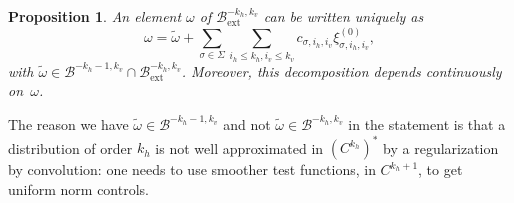 \documentclass[10pt]{amsart}
\newcommand{\ext}{\mathrm{ext}}
\newcommand{\boB}{\mathcal{B}}
\newtheorem{prop}[thm]{Proposition}
\theoremstyle{definition}
\numberwithin{equation}{section}
\begin{document}
\begin{prop}
\label{prop:finite_codim} An element $\omega$ of $\boB_{\ext}^{-k_h, k_v}$ can
be written uniquely as
\begin{equation}
\label{eq:dec_omega}
\omega = \tilde \omega + \sum_{\sigma \in \Sigma} \sum_{i_h \leq k_h, i_v\leq
k_v} c_{\sigma, i_h, i_v} \xi^{(0)}_{\sigma, i_h, i_v},
\end{equation}
with $\tilde\omega\!\in\!\boB^{-k_h-1, k_v} \cap \boB_{\ext}^{-k_h, k_v}$.
Moreover, this decomposition depends continuously on~$\omega$.
\end{prop}
The reason we have $\tilde\omega \in\boB^{-k_h-1, k_v}$ and not $\tilde\omega
\in\boB^{-k_h, k_v}$ in the statement is that a distribution of order $k_h$
is not well approximated in $(C^{k_h})^*$ by a regularization by convolution:
one needs to use smoother test functions, in $C^{k_h+1}$, to get uniform norm
controls.
\end{document}
